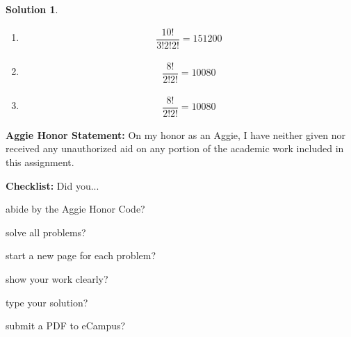 \documentclass{article}
\theoremstyle{definition}
\newtheorem*{solution}{Solution}
\newcommand{\honor}{\noindent \textbf{Aggie Honor Statement: }On my honor as an Aggie, I have neither
  given nor received any unauthorized aid on any portion of the academic work included in this assignment.
}
\newcommand{\checklist}{\noindent\textbf{Checklist:}
Did you...
\begin{compactenum}
\item abide by the Aggie Honor Code?
\item solve all problems?
\item start a new page for each problem?
\item show your work clearly?
\item type your solution?
\item submit a PDF to eCampus?
\end{compactenum}
}
\begin{document}
\begin{solution}\ \\
  \begin{enumerate}
    \item
      \begin{align*}
        \dfrac{10!}{3!2!2!} = 151200
      \end{align*}
    \item
      \begin{align*}
        \dfrac{8!}{2!2!} = 10080
      \end{align*}
    \item
      \begin{align*}
        \dfrac{8!}{2!2!} = 10080
      \end{align*}
  \end{enumerate}
\end{solution}


\bigskip
\honor

\bigskip
\checklist
\end{document}
